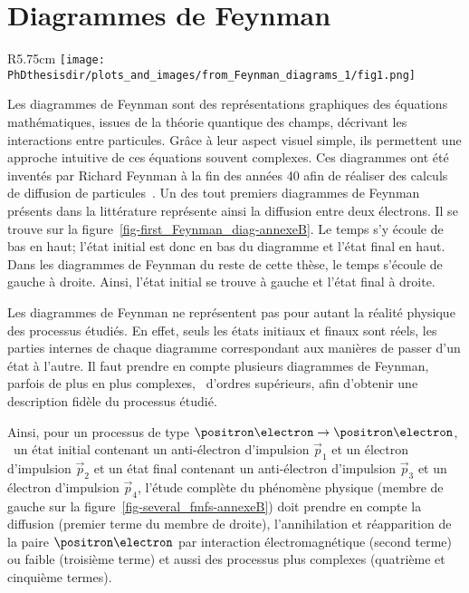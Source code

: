 \chapter{Diagrammes de Feynman}\label{annexe-fmf}
\begin{wrapfigure}{R}{5.75cm}
\centering
\texttt{[image: \\PhDthesisdir/plots\_and\_images/from\_Feynman\_diagrams\_1/fig1.png]}
\caption[Diagramme de Feynman de la diffusion électron-électron.]{Diagramme de Feynman de la diffusion électron-électron présenté dans la référence~\cite{Feynman_diagrams_1}. Ici, le temps s'écoule vers le haut; l'état initial est donc en bas du diagramme et l'état final en haut.}
\label{fig-first_Feynman_diag-annexeB}
\end{wrapfigure}
Les diagrammes de Feynman sont des représentations graphiques des équations mathématiques, issues de la théorie quantique des champs, décrivant les interactions entre particules.
Grâce à leur aspect visuel simple, ils permettent une approche intuitive de ces équations souvent complexes.
Ces diagrammes ont été inventés par Richard Feynman à la fin des années 40 afin de réaliser des calculs de diffusion de particules~\cite{Feynman_diagrams_1}.
Un des tout premiers diagrammes de Feynman présents dans la littérature représente ainsi la diffusion entre deux électrons.
Il se trouve sur la figure~\ref{fig-first_Feynman_diag-annexeB}.
Le temps s'y écoule de bas en haut; l'état initial est donc en bas du diagramme et l'état final en haut.
Dans les diagrammes de Feynman du reste de cette thèse, le temps s'écoule de gauche à droite.
Ainsi, l'état initial se trouve à gauche et l'état final à droite.
\par Les diagrammes de Feynman ne représentent pas pour autant la réalité physique des processus étudiés.
En effet, seuls les états initiaux et finaux sont réels, les parties internes de chaque diagramme correspondant aux manières de passer d'un état à l'autre.
Il faut prendre en compte plusieurs diagrammes de Feynman, parfois de plus en plus complexes, \ie\ d'ordres supérieurs, afin d'obtenir une description fidèle du processus étudié.
\par Ainsi, pour un processus de type $\positron\electron\to\positron\electron$, \ie\
un état initial contenant
un anti-électron d'impulsion $\vec{p}_1$
et
un électron d'impulsion $\vec{p}_2$
et
un état final contenant
un anti-électron d'impulsion $\vec{p}_3$
et
un électron d'impulsion $\vec{p}_4$,
l'étude complète du phénomène physique (membre de gauche sur la figure~\ref{fig-several_fmfs-annexeB}) doit prendre en compte la diffusion (premier terme du membre de droite), l'annihilation et réapparition de la paire $\positron\electron$ par interaction électromagnétique (second terme) ou faible (troisième terme) et aussi des processus plus complexes (quatrième et cinquième termes).
